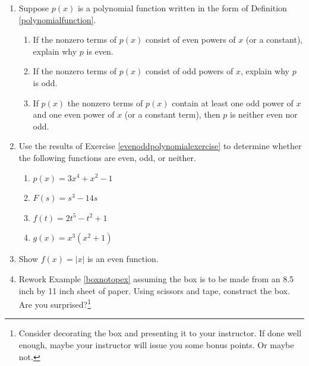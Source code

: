 \begin{enumerate}
\setcounter{enumi}{\value{HW}}

\item  \label{evenoddpolynomialexercise} Suppose $p(x)$ is a polynomial function written in the form of  Definition \ref{polynomialfunction}.  

\begin{enumerate}

\item  If the nonzero terms of $p(x)$ consist of even powers of $x$ (or a constant), explain why $p$ is even.

\item   If the nonzero terms of $p(x)$ consist of odd powers of $x$, explain why $p$ is odd.

\item  If $p(x)$ the nonzero terms of $p(x)$  contain at least one odd power of $x$ and one even power of $x$ (or a constant term), then $p$ is neither even nor odd.

\end{enumerate}

\newpage

\item  Use the results of Exercise \ref{evenoddpolynomialexercise} to determine whether the following functions are even, odd, or neither.

\begin{multicols}{4}
\begin{enumerate}

\item  $p(x) = 3x^4 + x^2 - 1$

\item  $F(s) = s^3 - 14s$

\item  $f(t) = 2t^5 - t^2 + 1$

\item  $g(x) =x^3(x^2+1)$

\end{enumerate}

\end{multicols}

\item  Show  $f(x) = |x|$ is an even function.


\item  Rework Example \ref{boxnotopex} assuming the box is to be made from an 8.5 inch by 11 inch sheet of paper. Using scissors and tape, construct the box.  Are you surprised?\footnote{Consider decorating the box and presenting it to your instructor. If done well enough, maybe your instructor will issue you some bonus points.  Or maybe not.}


\end{enumerate}
